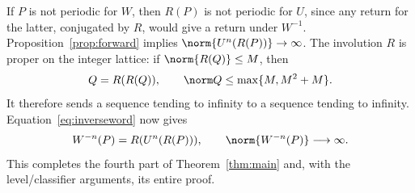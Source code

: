 If $P$ is not periodic for $W$, then $R(P)$ is not
periodic for $U$, since any return for the latter,
conjugated by $R$, would give a return under $W^{-1}$.
Proposition~\ref{prop:forward} implies
$\norm{U^n(R(P))}\to\infty$.
The involution $R$ is proper on the integer lattice:
if $\norm{R(Q)}\le M$, then
\[
 Q=R(R(Q)),\qquad
 \norm Q\le\max\{M,M^2+M\}.
\]
It therefore sends a sequence tending to infinity
to a sequence tending to infinity. Equation~\eqref{eq:inverseword}
now gives
\[
 W^{-n}(P)=R(U^n(R(P))),\qquad
 \norm{W^{-n}(P)}\longrightarrow\infty .
\]
This completes the fourth part of Theorem~\ref{thm:main}
and, with the level/classifier arguments, its entire proof.
